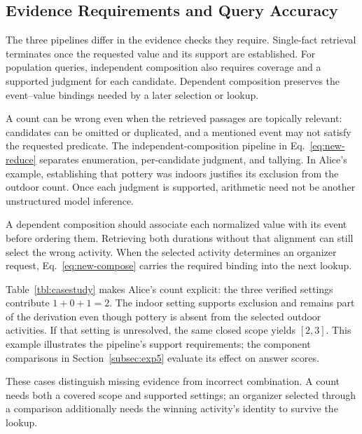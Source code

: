 \subsection{Evidence Requirements and Query Accuracy}
\label{subsec:exp3}

The three pipelines differ in the evidence checks they require.
Single-fact retrieval terminates once the requested value and its support
are established. For population queries, independent composition also requires
coverage and a supported judgment for each candidate. Dependent composition
preserves the event--value bindings needed by a later selection or lookup.

A count can be wrong even when the retrieved passages are topically
relevant: candidates can be omitted or duplicated, and a mentioned
event may not satisfy the requested predicate.
The independent-composition pipeline in Eq.~\eqref{eq:new-reduce} separates
enumeration, per-candidate judgment, and tallying.
In Alice's example, establishing that pottery was indoors justifies its
exclusion from the outdoor count. Once each judgment is supported,
arithmetic need not be another unstructured model inference.

A dependent composition should associate each normalized value with its event
before ordering them. Retrieving both durations without that alignment
can still select the wrong activity. When the selected activity determines
an organizer request, Eq.~\eqref{eq:new-compose} carries the required
binding into the next lookup.



Table~\ref{tbl:casestudy} makes Alice's count explicit: the three
verified settings contribute $1+0+1=2$. The indoor setting supports
exclusion and remains part of the derivation even though pottery is
absent from the selected outdoor activities. If that setting is
unresolved, the same closed scope yields $[2,3]$. This example illustrates
the pipeline's support requirements; the component comparisons in
Section~\ref{subsec:exp5} evaluate its effect on answer scores.

These cases distinguish missing evidence from incorrect combination.
A count needs both a covered scope and supported settings; an organizer
selected through a comparison additionally needs the winning activity's
identity to survive the lookup.




